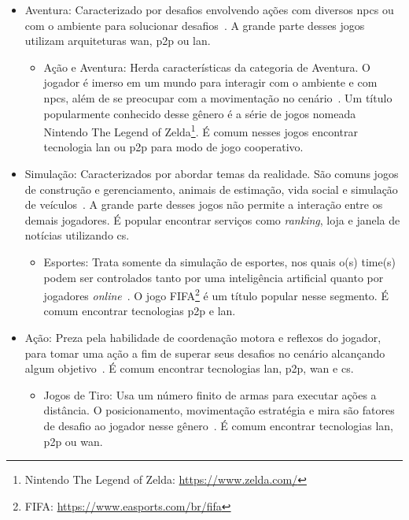 \begin{itemize}
\begin{itemize}
    \end{itemize}
  \item Aventura: Caracterizado por desafios envolvendo ações com diversos \acp{npc} ou com o ambiente para solucionar desafios~\cite{adams_1208533}. A grande parte desses jogos utilizam arquiteturas \ac{wan}, \ac{p2p} ou \ac{lan}.
    \begin{itemize}
      \item Ação e Aventura: Herda características da categoria de Aventura. O jogador é imerso em um mundo para interagir com o ambiente e com \acp{npc}, além de se preocupar com a movimentação no cenário~\cite{adams_1208533}. Um título popularmente conhecido desse gênero é a série de jogos nomeada Nintendo The Legend of Zelda\footnote{Nintendo The Legend of Zelda: \url{https://www.zelda.com/}}. É comum nesses jogos encontrar tecnologia \ac{lan} ou \ac{p2p} para modo de jogo cooperativo.
    \end{itemize}
  \item Simulação: Caracterizados por abordar temas da realidade. São comuns jogos de construção e gerenciamento, animais de estimação, vida social e simulação de veículos~\cite{adams_1208533}. A grande parte desses jogos não permite a interação entre os demais jogadores. É popular encontrar serviços como \textit{ranking}, loja e janela de notícias utilizando \ac{cs}.
    \begin{itemize}
      \item Esportes: Trata somente da simulação de esportes, nos quais o(s) time(s) podem ser controlados tanto por uma inteligência artificial quanto por jogadores \textit{online}~\cite{adams_1208533}. O jogo FIFA\footnote{FIFA: \url{https://www.easports.com/br/fifa}} é um título popular nesse segmento. É comum encontrar tecnologias \ac{p2p} e \ac{lan}.
    \end{itemize}
  \item Ação: Preza pela habilidade de coordenação motora e reflexos do jogador, para tomar uma ação a fim de superar seus desafios no cenário alcançando algum objetivo~\cite{adams_1208533}. É comum encontrar tecnologias \ac{lan}, \ac{p2p}, \ac{wan} e \ac{cs}.
    \begin{itemize}
      \item Jogos de Tiro: Usa um número finito de armas para executar ações a distância. O posicionamento, movimentação estratégia e mira são fatores de desafio ao jogador nesse gênero~\cite{adams_1208533}. É comum encontrar tecnologias \ac{lan}, \ac{p2p} ou \ac{wan}.
        \begin{itemize}

\end{itemize}
\end{itemize}
\end{itemize}
